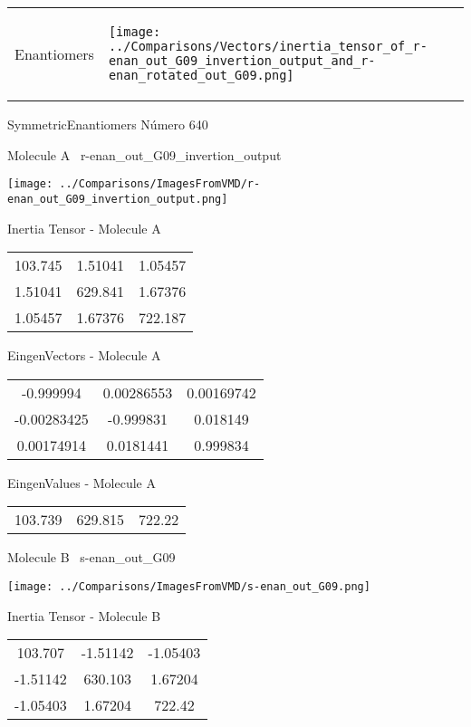 \vtab[-5mm]
\begin{tabular}{*{2}{m{}}}
\begin{center}
\textcolor{NavyBlue}{\Large Enantiomers}
\end{center}
&
\begin{center}
\texttt{[image: ../Comparisons/Vectors/inertia\_tensor\_of\_r-enan\_out\_G09\_invertion\_output\_and\_r-enan\_rotated\_out\_G09.png]}
\end{center}
\end{tabular}

 \newpage

\vtab[-3cm]
\begin{center}
{\large SymmetricEnantiomers \tab Número 640}
\end{center}
\begin{multicols}{2}
\begin{center}

Molecule A \
r-enan\_out\_G09\_invertion\_output

\texttt{[image: ../Comparisons/ImagesFromVMD/r-enan\_out\_G09\_invertion\_output.png]}

Inertia Tensor - Molecule A \\
\begin{tabular}{|c c c|}
103.745	 & 	1.51041	 & 	1.05457	 \\
1.51041	 & 	629.841	 & 	1.67376	 \\
1.05457	 & 	1.67376	 & 	722.187
\end{tabular}

\vtab
 EingenVectors - Molecule A     \\
\begin{tabular}{|c c c|}
-0.999994	 & 	0.00286553	 & 	0.00169742	 \\
-0.00283425	 & 	-0.999831	 & 	0.018149	 \\
0.00174914	 & 	0.0181441	 & 	0.999834
\end{tabular}

\vtab
 EingenValues - Molecule A     \\
\begin{tabular}{|c c c|}
103.739	 & 	629.815	 & 	722.22	 \\
\end{tabular}
\columnbreak

Molecule B \
s-enan\_out\_G09

\texttt{[image: ../Comparisons/ImagesFromVMD/s-enan\_out\_G09.png]}

Inertia Tensor - Molecule B \\
\begin{tabular}{|c c c|}
103.707	 & 	-1.51142	 & 	-1.05403	 \\
-1.51142	 & 	630.103	 & 	1.67204	 \\
-1.05403	 & 	1.67204	 & 	722.42
\end{tabular}


\end{center}
\end{multicols}
